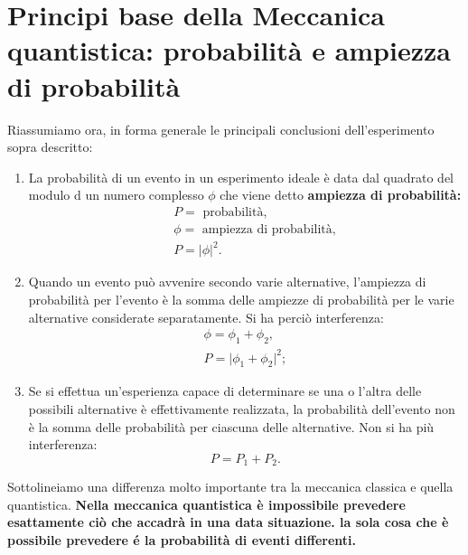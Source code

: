 \section[Probabilità e ampiezza di probabilità]{Principi base della Meccanica quantistica: probabilità e ampiezza di probabilità}
Riassumiamo ora, in forma generale le principali conclusioni dell'esperimento sopra descritto:
\begin{enumerate}
\item La probabilità di un evento in un esperimento ideale è data dal quadrato del modulo d un numero complesso $\phi$ che viene detto \textbf{ampiezza di probabilità:}
\begin{eqnarray}
& & P = \textrm{ probabilità}, \nonumber \\
& & \phi = \textrm{ ampiezza di probabilità}, \nonumber \\
& & P = \lvert \phi \rvert ^2 .
\end{eqnarray}
\item Quando un evento può avvenire secondo varie alternative, l'ampiezza di probabilità per l'evento è la somma delle ampiezze di probabilità per le varie alternative considerate separatamente. Si ha perciò interferenza:
\begin{eqnarray}
&\phi = \phi_1 + \phi _2,&  \\
&P = \lvert \phi_1 + \phi _2 \rvert ^2;&
\end{eqnarray}
\item Se si effettua un'esperienza capace di determinare se una o l'altra delle possibili alternative è effettivamente realizzata, la probabilità dell'evento non è la somma delle probabilità per ciascuna delle alternative. Non si ha più interferenza:
\begin{equation}
P= P_1 + P_2.
\end{equation}
\end{enumerate}
Sottolineiamo una differenza molto importante tra la meccanica classica e quella quantistica. \textbf{Nella meccanica quantistica è impossibile prevedere esattamente ciò che accadrà in una data situazione. la sola cosa che è possibile prevedere é la probabilità di eventi differenti.}
